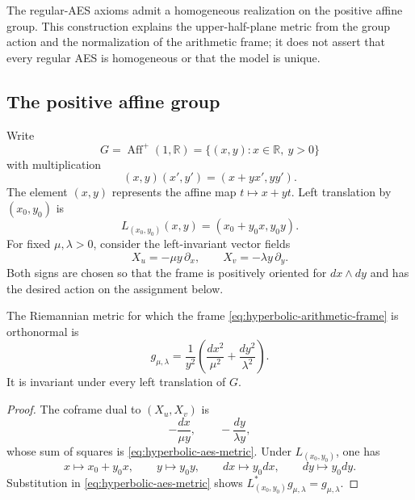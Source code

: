 The regular-AES axioms admit a homogeneous realization on the positive affine
group.  This construction explains the upper-half-plane metric from the group
action and the normalization of the arithmetic frame; it does not assert that
every regular AES is homogeneous or that the model is unique.

\subsection{The positive affine group}

Write
\[
 G=\operatorname{Aff}^{+}(1,\mathbb R)
   =\{(x,y):x\in\mathbb R,\ y>0\}
\]
with multiplication
\begin{equation}\label{eq:positive-affine-group-law}
 (x,y)(x',y')=(x+yx',yy').
\end{equation}
The element \((x,y)\) represents the affine map \(t\mapsto x+yt\).
Left translation by \((x_0,y_0)\) is
\[
 L_{(x_0,y_0)}(x,y)=(x_0+y_0x,y_0y).
\]
For fixed \(\mu,\lambda>0\), consider the left-invariant vector fields
\begin{equation}\label{eq:hyperbolic-arithmetic-frame}
 X_u=-\mu y\,\partial_x,
 \qquad
 X_v=-\lambda y\,\partial_y .
\end{equation}
Both signs are chosen so that the frame is positively oriented for
\(dx\wedge dy\) and has the desired action on the assignment below.

\begin{proposition}\label{prop:invariant-affine-metric}
The Riemannian metric for which the frame
\eqref{eq:hyperbolic-arithmetic-frame} is orthonormal is
\begin{equation}\label{eq:hyperbolic-aes-metric}
 g_{\mu,\lambda}
 =\frac1{y^2}
  \left(\frac{dx^2}{\mu^2}+\frac{dy^2}{\lambda^2}\right).
\end{equation}
It is invariant under every left translation of \(G\).
\end{proposition}

\begin{proof}
The coframe dual to \((X_u,X_v)\) is
\[
 -\frac{dx}{\mu y},
 \qquad
 -\frac{dy}{\lambda y},
\]
whose sum of squares is \eqref{eq:hyperbolic-aes-metric}.  Under
\(L_{(x_0,y_0)}\), one has
\[
 x\longmapsto x_0+y_0x,\qquad
 y\longmapsto y_0y,\qquad
 dx\longmapsto y_0dx,\qquad
 dy\longmapsto y_0dy.
\]
Substitution in \eqref{eq:hyperbolic-aes-metric} shows
\(L_{(x_0,y_0)}^*g_{\mu,\lambda}=g_{\mu,\lambda}\).
\end{proof}

